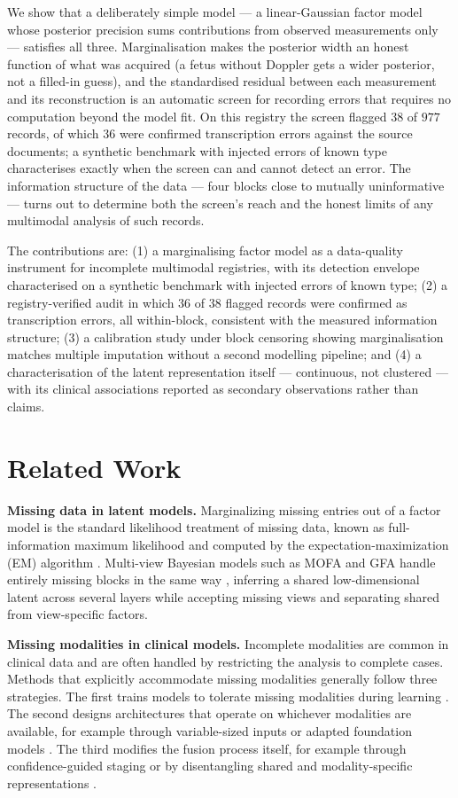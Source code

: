 \documentclass[a4paper,fleqn]{cas-sc}
\begin{document}
We show that a deliberately simple model --- a linear-Gaussian factor model whose posterior precision sums contributions from observed measurements only --- satisfies all three. Marginalisation makes the posterior width an honest function of what was acquired (a fetus without Doppler gets a wider posterior, not a filled-in guess), and the standardised residual between each measurement and its reconstruction is an automatic screen for recording errors that requires no computation beyond the model fit. On this registry the screen flagged $38$ of $977$ records, of which $36$ were confirmed transcription errors against the source documents; a synthetic benchmark with injected errors of known type characterises exactly when the screen can and cannot detect an error. The information structure of the data --- four blocks close to mutually uninformative --- turns out to determine both the screen's reach and the honest limits of any multimodal analysis of such records.

The contributions are: (1) a marginalising factor model as a data-quality instrument for incomplete multimodal registries, with its detection envelope characterised on a synthetic benchmark with injected errors of known type; (2) a registry-verified audit in which $36$ of $38$ flagged records were confirmed as transcription errors, all within-block, consistent with the measured information structure; (3) a calibration study under block censoring showing marginalisation matches multiple imputation without a second modelling pipeline; and (4) a characterisation of the latent representation itself --- continuous, not clustered --- with its clinical associations reported as secondary observations rather than claims.
\section{Related Work}

\noindent\textbf{Missing data in latent models.} Marginalizing missing entries out of a factor model is the standard likelihood treatment of missing data, known as full-information maximum likelihood \cite{ref:fiml} and computed by the expectation-maximization (EM) algorithm \cite{ref:em}. Multi-view Bayesian models such as MOFA and GFA handle entirely missing blocks in the same way \cite{ref:mofa,ref:gfa}, inferring a shared low-dimensional latent across several layers while accepting missing views and separating shared from view-specific factors.

\noindent\textbf{Missing modalities in clinical models.} Incomplete modalities are common in clinical data and are often handled by restricting the analysis to complete cases. Methods that explicitly accommodate missing modalities generally follow three strategies. The first trains models to tolerate missing modalities during learning \cite{ref:dropout}. The second designs architectures that operate on whichever modalities are available, for example through variable-sized inputs \cite{ref:hypermm} or adapted foundation models \cite{ref:mmdino}. The third modifies the fusion process itself, for example through confidence-guided staging \cite{ref:medpatch} or by disentangling shared and modality-specific representations \cite{ref:drfuse}.
\end{document}
